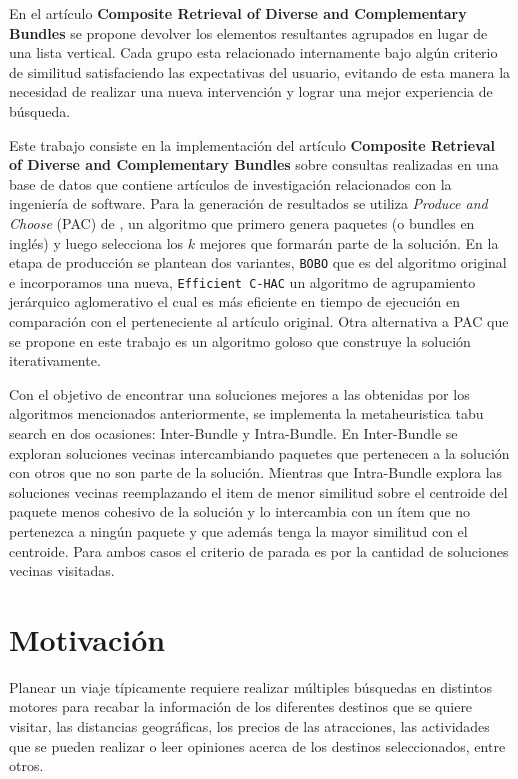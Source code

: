 En el artículo \textbf{Composite Retrieval of Diverse and Complementary Bundles}\cite{compositeRetrival} se propone devolver los elementos resultantes agrupados en lugar de una lista vertical. Cada grupo esta relacionado internamente bajo algún criterio de similitud satisfaciendo las expectativas del usuario, evitando de esta manera la necesidad de realizar una nueva intervención y lograr una mejor experiencia de búsqueda.

Este trabajo consiste en la implementación del artículo \textbf{Composite Retrieval of Diverse and Complementary Bundles} sobre consultas realizadas en una base de datos que contiene artículos de investigación relacionados con la ingeniería de software. Para la generación de resultados se utiliza \textit{Produce and Choose} (PAC) de \cite{compositeRetrival}, un algoritmo que primero genera paquetes (o bundles en inglés) y luego selecciona los $k$ mejores que formarán parte de la solución. En la etapa de producción se plantean dos variantes, \texttt{BOBO} que es del algoritmo original e incorporamos una nueva, \texttt{Efficient C-HAC} un algoritmo de agrupamiento jerárquico aglomerativo el cual es más eficiente en tiempo de ejecución en comparación con el perteneciente al artículo original. Otra alternativa a PAC que se propone en este trabajo es un algoritmo goloso que construye la solución iterativamente.

Con el objetivo de encontrar una soluciones mejores a las obtenidas por los algoritmos mencionados anteriormente, se implementa la metaheuristica tabu search en dos ocasiones: Inter-Bundle y Intra-Bundle. En Inter-Bundle se exploran soluciones vecinas intercambiando paquetes que pertenecen a la solución con otros que no son parte de la solución. Mientras que Intra-Bundle explora las soluciones vecinas reemplazando el item de menor similitud sobre el centroide del paquete menos cohesivo de la solución y lo intercambia con un ítem que no pertenezca a ningún paquete y que además tenga la mayor similitud con el centroide. Para ambos casos el criterio de parada es por la cantidad de soluciones vecinas visitadas.

\section{Motivación}
Planear un viaje típicamente requiere realizar múltiples búsquedas en distintos motores para recabar la información de los diferentes destinos que se quiere visitar, las distancias geográficas, los precios de las atracciones, las actividades que se pueden realizar o leer opiniones acerca de los destinos seleccionados, entre otros.

